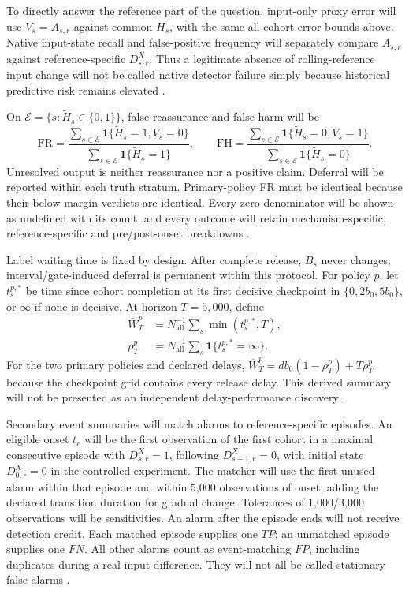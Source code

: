 \documentclass[11pt,a4paper]{article}
\newcommand{\ind}{\mathbf{1}}
\begin{document}
To directly answer the reference part of the question, input-only proxy error
will use $V_s=A_{s,r}$ against common $H_s$, with the same all-cohort error
bounds above. Native input-state recall and false-positive frequency will
separately compare $A_{s,r}$ against reference-specific $D^X_{s,r}$. Thus a
legitimate absence of rolling-reference input change will not be called native
detector failure simply because historical predictive risk remains elevated
\cite{window,cerqueira}.

On $\mathcal E=\{s:\widetilde H_s\in\{0,1\}\}$, false reassurance and false
harm will be
\begin{equation}
\mathrm{FR}=\frac{\sum_{s\in\mathcal E}\ind\{\widetilde H_s=1,V_s=0\}}
{\sum_{s\in\mathcal E}\ind\{\widetilde H_s=1\}},\qquad
\mathrm{FH}=\frac{\sum_{s\in\mathcal E}\ind\{\widetilde H_s=0,V_s=1\}}
{\sum_{s\in\mathcal E}\ind\{\widetilde H_s=0\}}.
\end{equation}
Unresolved output is neither reassurance nor a positive claim. Deferral will be
reported within each truth stratum. Primary-policy FR must be identical because
their below-margin verdicts are identical. Every zero denominator will be shown
as undefined with its count, and every outcome will retain mechanism-specific,
reference-specific and pre/post-onset breakdowns \cite{selective}.

Label waiting time is fixed by design. After complete release, $B_s$ never
changes; interval/gate-induced deferral is permanent within this protocol.
For policy $p$, let $t_s^{p,*}$ be time since cohort completion at its first
decisive checkpoint in $\{0,2b_0,5b_0\}$, or $\infty$ if none is decisive.
At horizon $T=5{,}000$, define
\begin{align}
\overline W_T^p&=N_{\mathrm{all}}^{-1}\sum_s\min(t_s^{p,*},T),\\
\rho_T^p&=N_{\mathrm{all}}^{-1}\sum_s\ind\{t_s^{p,*}=\infty\}.
\end{align}
For the two primary policies and declared delays,
$\overline W_T^p=db_0(1-\rho_T^p)+T\rho_T^p$ because the checkpoint grid
contains every release delay. This derived summary will not be presented as
an independent delay-performance discovery \cite{alencar}.

Secondary event summaries will match alarms to reference-specific episodes.
An eligible onset $t_e$ will be the first observation of the first cohort in
a maximal consecutive episode with $D^X_{s,r}=1$, following $D^X_{s-1,r}=0$,
with initial state $D^X_{0,r}=0$ in the controlled experiment.
The matcher will use the first unused alarm within that episode and within
5,000 observations of onset, adding the declared transition duration for
gradual change. Tolerances of 1,000/3,000 observations will be sensitivities.
An alarm after the episode ends will not receive detection credit. Each matched
episode supplies one $TP$; an unmatched episode supplies one $FN$. All other
alarms count as event-matching $FP$, including duplicates during a real input difference.
They will not all be called stationary false alarms \cite{window,cerqueira}.
\end{document}
